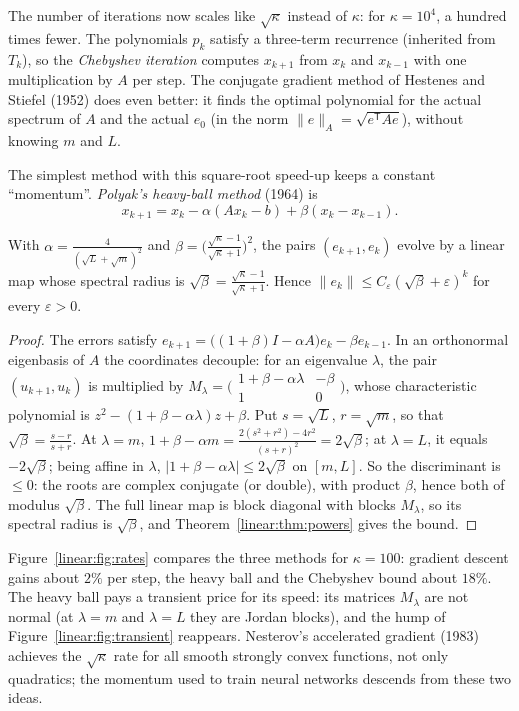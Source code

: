 The number of iterations now scales like $\sqrt\kappa$ instead of $\kappa$: for $\kappa=10^4$, a hundred times fewer. The polynomials
$p_k$ satisfy a three-term recurrence (inherited from $T_k$), so the \emph{Chebyshev iteration} computes $x_{k+1}$ from $x_k$ and $x_{k-1}$
with one multiplication by $A$ per step. The conjugate gradient method of Hestenes and Stiefel (1952) does even better: it finds
the optimal polynomial for the actual spectrum of $A$ and the actual $e_0$ (in the norm $\|e\|_A=\sqrt{e^{\mathsf T}Ae}$), without knowing $m$
and $L$.

The simplest method with this square-root speed-up keeps a constant ``momentum''. \emph{Polyak's heavy-ball method} (1964) is
\[
x_{k+1}=x_k-\alpha(Ax_k-b)+\beta(x_k-x_{k-1}).
\]

\begin{theorem}\label{linear:thm:heavyball}
With $\alpha=\frac4{(\sqrt L+\sqrt m)^2}$ and $\beta=\bigl(\frac{\sqrt\kappa-1}{\sqrt\kappa+1}\bigr)^2$, the pairs $(e_{k+1},e_k)$ evolve by a
linear map whose spectral radius is $\sqrt\beta=\frac{\sqrt\kappa-1}{\sqrt\kappa+1}$. Hence $\|e_k\|\le C_\varepsilon(\sqrt\beta+\varepsilon)^k$ for every
$\varepsilon>0$.
\end{theorem}
\begin{proof}
The errors satisfy $e_{k+1}=\bigl((1+\beta)I-\alpha A\bigr)e_k-\beta e_{k-1}$. In an orthonormal eigenbasis of $A$ the coordinates decouple:
for an eigenvalue $\lambda$, the pair $(u_{k+1},u_k)$ is multiplied by $M_\lambda=\bigl(\begin{smallmatrix}1+\beta-\alpha\lambda&-\beta\\1&0
\end{smallmatrix}\bigr)$, whose characteristic polynomial is $z^2-(1+\beta-\alpha\lambda)z+\beta$. Put $s=\sqrt L$, $r=\sqrt m$, so that
$\sqrt\beta=\frac{s-r}{s+r}$. At $\lambda=m$, $1+\beta-\alpha m=\frac{2(s^2+r^2)-4r^2}{(s+r)^2}=2\sqrt\beta$; at $\lambda=L$, it equals $-2\sqrt\beta$;
being affine in $\lambda$, $|1+\beta-\alpha\lambda|\le2\sqrt\beta$ on $[m,L]$. So the discriminant is $\le0$: the roots are complex conjugate
(or double), with product $\beta$, hence both of modulus $\sqrt\beta$. The full linear map is block diagonal with blocks $M_\lambda$, so
its spectral radius is $\sqrt\beta$, and Theorem~\ref{linear:thm:powers} gives the bound.
\end{proof}

Figure~\ref{linear:fig:rates} compares the three methods for $\kappa=100$: gradient descent gains about $2\%$ per step, the heavy ball and the
Chebyshev bound about $18\%$. The heavy ball pays a transient price for its speed: its matrices $M_\lambda$ are not normal (at
$\lambda=m$ and $\lambda=L$ they are Jordan blocks), and the hump of Figure~\ref{linear:fig:transient} reappears. Nesterov's accelerated
gradient (1983) achieves the $\sqrt\kappa$ rate for all smooth strongly convex functions, not only quadratics; the momentum used to train
neural networks descends from these two ideas.

